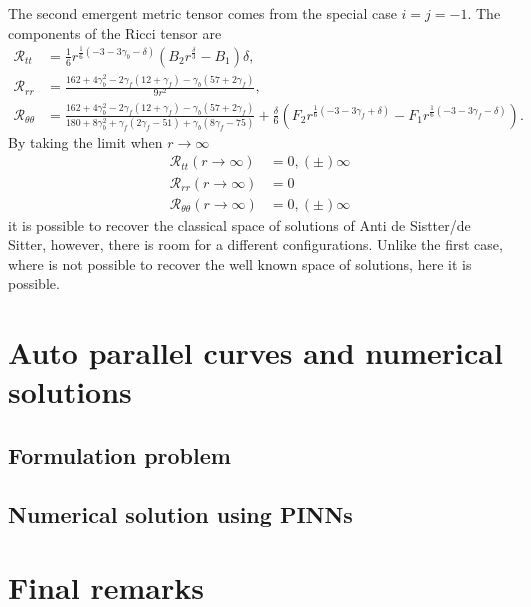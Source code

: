 \documentclass{article}
\begin{document}
The second emergent metric tensor comes from the special case $i = j = -1$. The components of 
the Ricci tensor are
\begin{align}
    \mathcal{R}_{tt} & = \frac{1}{6}r^{\frac{1}{6}\left(-3 - 3\gamma_b -\delta\right)}\left(B_2r^{\frac{\delta}{3}} - B_1\right)\delta, \\
    \mathcal{R}_{rr} & = \frac{162 + 4\gamma_b^2 - 2\gamma_f \left(12 + \gamma_f\right) - \gamma_b\left(57 + 2\gamma_f\right)}{9r^2}, \\
    \mathcal{R}_{\theta\theta} & = \frac{162 + 4\gamma_b^2 - 2\gamma_f \left(12 + \gamma_f\right) - \gamma_b\left(57 + 2\gamma_f\right)}{180 + 8\gamma_b^2 + \gamma_f \left(2\gamma_f - 51\right) + \gamma_b\left(8\gamma_f - 75\right)} 
    + \frac{\delta}{6} \left(F_2r^{\frac{1}{6}\left(-3 - 3\gamma_f + \delta\right)} - F_1r^{\frac{1}{6}\left(-3 - 3\gamma_f - \delta\right)}\right).
\end{align}
By taking the limit when $r \to \infty$
\begin{align}
    \mathcal{R}_{tt}(r \to \infty) & = 0, (\pm)\infty \\
    \mathcal{R}_{rr}(r \to \infty) & = 0 \\
    \mathcal{R}_{\theta\theta}(r \to \infty) & = 0,(\pm)\infty
\end{align}
it is possible to recover the classical space of solutions of Anti de Sistter/de Sitter, however, there
is room for a different configurations. Unlike the first case, where is not possible to recover the well known
space of solutions, here it is possible.

\section{Auto parallel curves and numerical solutions}

\subsection{Formulation problem}

\subsection{Numerical solution using PINNs}

\section{Final remarks}
\label{sec:final_remarks}



\end{document}
